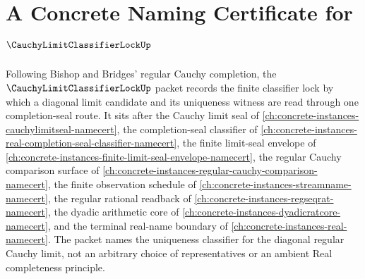 \chapter{A Concrete Naming Certificate for $\CauchyLimitClassifierLockUp$}
\label{ch:concrete-instances-cauchy-limit-classifier-lock-namecert}

Following Bishop and Bridges' regular Cauchy completion, the $\CauchyLimitClassifierLockUp$ packet records the finite classifier lock by which a diagonal limit candidate and its uniqueness witness are read through one completion-seal route. It sits after the Cauchy limit seal of \autoref{ch:concrete-instances-cauchylimitseal-namecert}, the completion-seal classifier of \autoref{ch:concrete-instances-real-completion-seal-classifier-namecert}, the finite limit-seal envelope of \autoref{ch:concrete-instances-finite-limit-seal-envelope-namecert}, the regular Cauchy comparison surface of \autoref{ch:concrete-instances-regular-cauchy-comparison-namecert}, the finite observation schedule of \autoref{ch:concrete-instances-streamname-namecert}, the regular rational readback of \autoref{ch:concrete-instances-regseqrat-namecert}, the dyadic arithmetic core of \autoref{ch:concrete-instances-dyadicratcore-namecert}, and the terminal real-name boundary of \autoref{ch:concrete-instances-real-namecert}. The packet names the uniqueness classifier for the diagonal regular Cauchy limit, not an arbitrary choice of representatives or an ambient Real completeness principle.

